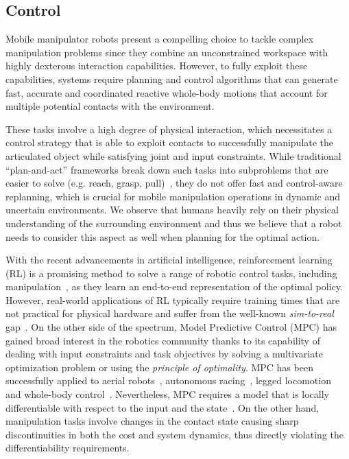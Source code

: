 \subsection{Control} \label{sec:related_work_control}
Mobile manipulator robots present a compelling choice to tackle complex manipulation problems since they combine an unconstrained workspace with highly dexterous interaction capabilities. However, to fully exploit these capabilities, systems require planning and control algorithms that can generate fast, accurate and coordinated reactive whole-body motions that account for multiple potential contacts with the environment. 

These tasks involve a high degree of physical interaction, which necessitates a control strategy that is able to exploit contacts to successfully manipulate the articulated object while satisfying joint and input constraints. While traditional ``plan-and-act'' frameworks break down such tasks into subproblems that are easier to solve (e.g. reach, grasp, pull)~\cite{Murali2020}, they do not offer fast and control-aware replanning, which is crucial for mobile manipulation operations in dynamic and uncertain environments. We observe that humans heavily rely on their physical understanding of the surrounding environment and thus we believe that a robot needs to consider this aspect as well when planning for the optimal action.

With the recent advancements in artificial intelligence, reinforcement learning (RL) is a promising method to solve a range of robotic control tasks, including manipulation~\cite{finn2016deep}, as they learn an end-to-end representation of the optimal policy. However, real-world applications of RL typically require training times that are not practical for physical hardware and suffer from the well-known \emph{sim-to-real} gap~\cite{chebotar2019closing}. 
On the other side of the spectrum, Model Predictive Control (MPC) has gained broad interest in the robotics community thanks to its capability of dealing with input constraints and task objectives by solving a multivariate optimization problem or using the \emph{principle of optimality}. 
MPC has been successfully applied to aerial robots~\cite{brunner2020trajectory}, autonomous racing~\cite{liniger2015optimization}, legged locomotion~\cite{grandia2019frequency} and whole-body control~\cite{minniti2019whole}. Nevertheless, MPC requires a model that is locally differentiable with respect to the input and the state~\cite{buchli2017optimal}. On the other hand, manipulation tasks involve changes in the contact state causing sharp discontinuities in both the cost and system dynamics, thus directly violating the differentiability requirements. 


